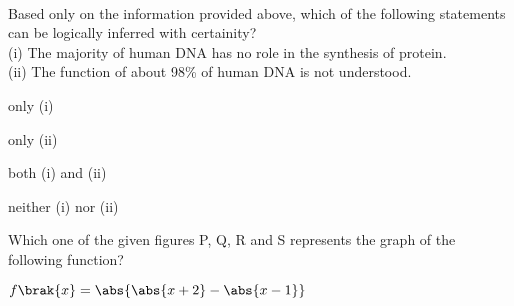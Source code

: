 \\
Based only on the information provided above, which of the following statements can be logically inferred with certainity?\\
(i)  The majority of human DNA has no role in the synthesis of protein. \\
(ii) The function of about 98\% of human DNA is not understood.
\begin{enumerate}
\begin{multicols}{2}
\item only (i)
\item only (ii)
\item both (i) and (ii)
\item neither (i) nor (ii)
\end{multicols}
\end{enumerate}
\item %
Which one of the given figures P, Q, R and S represents the graph of the following function?\\
\begin{center}
$f\brak{x}=\abs{\abs{x+2}-\abs{x-1}}$
\end{center}
